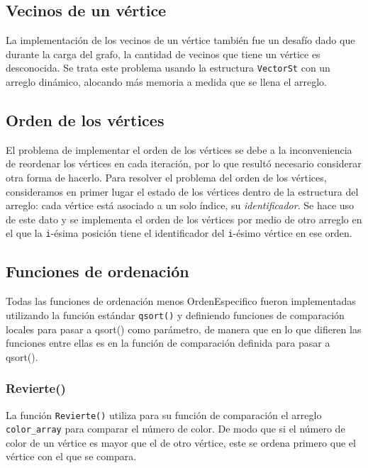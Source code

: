 \documentclass[11pt,a4paper]{article}
\theoremstyle{plain}
\begin{document}
	\subsection{Vecinos de un vértice}

La implementación de los vecinos de un vértice también fue un desafío dado que durante la carga del grafo, la cantidad de vecinos que tiene un vértice es desconocida. Se trata este problema usando la estructura \texttt{VectorSt} con un arreglo dinámico, alocando más memoria a medida que se llena el arreglo.

	\subsection{Orden de los vértices}

El problema de implementar el orden de los vértices se debe a la inconveniencia de reordenar los vértices en cada iteración, por lo que resultó necesario considerar otra forma de hacerlo. Para resolver el problema del orden de los vértices, consideramos en primer lugar el estado de los vértices dentro de la estructura del arreglo: cada vértice está asociado a un solo índice, su \emph{identificador}. Se hace uso de este dato y se implementa el orden de los vértices por medio de otro arreglo en el que la \texttt{i}-ésima posición tiene el identificador del \texttt{i}-ésimo vértice en ese orden.


	\subsection{Funciones de ordenación}

Todas las funciones de ordenación menos OrdenEspecifico fueron implementadas utilizando la función estándar \texttt{qsort()} y definiendo funciones de comparación locales para pasar a qsort() como parámetro, de manera que en lo que difieren las funciones entre ellas es en la función de comparación definida para pasar a qsort().

		\subsubsection{Revierte()}

La función \texttt{Revierte()} utiliza para su función de comparación el arreglo \texttt{color\_array} para comparar el número de color. De modo que si el número de color de un vértice es mayor que el de otro vértice, este se ordena primero que el vértice con el que se compara.
\end{document}
